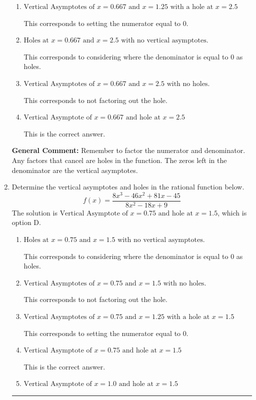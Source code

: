 \documentclass{extbook}[14pt]
\newcommand{\litem}[1]{\item #1

\rule{\textwidth}{0.4pt}}
\begin{document}
\begin{enumerate}
{\begin{enumerate}[label=\Alph*.]
This corresponds to mixing vertical and horizontal asymptotes.
\item \( \text{Vertical Asymptotes of } x = 0.667 \text{ and } x = 1.25 \text{ with a hole at } x = 2.5 \)

This corresponds to setting the numerator equal to 0.
\item \( \text{Holes at } x = 0.667 \text{ and } x = 2.5 \text{ with no vertical asymptotes.} \)

This corresponds to considering where the denominator is equal to 0 as holes.
\item \( \text{Vertical Asymptotes of } x = 0.667 \text{ and } x = 2.5 \text{ with no holes.} \)

This corresponds to not factoring out the hole.
\item \( \text{Vertical Asymptote of } x = 0.667 \text{ and hole at } x = 2.5 \)

This is the correct answer.
\end{enumerate}

\textbf{General Comment:} Remember to factor the numerator and denominator. Any factors that cancel are holes in the function. The zeros left in the denominator are the vertical asymptotes.
}
\litem{
Determine the vertical asymptotes and holes in the rational function below.
\[ f(x) = \frac{8x^{3} -46 x^{2} +81 x -45}{8x^{2} -18 x + 9} \]The solution is \( \text{Vertical Asymptote of } x = 0.75 \text{ and hole at } x = 1.5 \), which is option D.\begin{enumerate}[label=\Alph*.]
\item \( \text{Holes at } x = 0.75 \text{ and } x = 1.5 \text{ with no vertical asymptotes.} \)

This corresponds to considering where the denominator is equal to 0 as holes.
\item \( \text{Vertical Asymptotes of } x = 0.75 \text{ and } x = 1.5 \text{ with no holes.} \)

This corresponds to not factoring out the hole.
\item \( \text{Vertical Asymptotes of } x = 0.75 \text{ and } x = 1.25 \text{ with a hole at } x = 1.5 \)

This corresponds to setting the numerator equal to 0.
\item \( \text{Vertical Asymptote of } x = 0.75 \text{ and hole at } x = 1.5 \)

This is the correct answer.
\item \( \text{Vertical Asymptote of } x = 1.0 \text{ and hole at } x = 1.5 \)


\end{enumerate}}
\end{enumerate}
\end{document}
